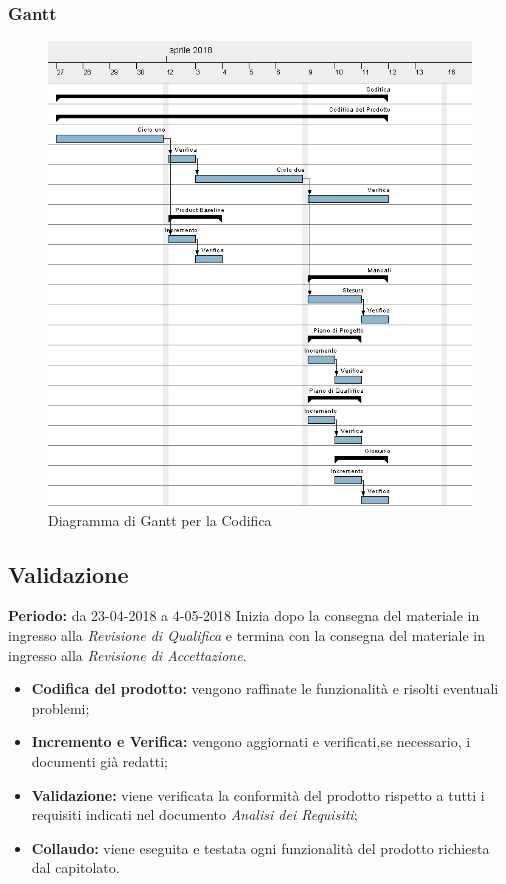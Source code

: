 \subsubsection{Gantt}
\begin{figure}[H]
	\centering 
	\includegraphics[width=1\textwidth]{images/Codifica.png}
	\caption{Diagramma di Gantt per la Codifica}
	\label{graficobello5} 
\end{figure}
\subsection{Validazione}
    \textbf{Periodo:} da 23-04-2018 a 4-05-2018\Spazio
    Inizia dopo la consegna del materiale in ingresso alla \emph{Revisione di Qualifica} e termina con la consegna del materiale in ingresso alla \emph{Revisione di Accettazione}.
    \begin{itemize}
    	\item \textbf{Codifica del prodotto:} vengono raffinate le funzionalità e risolti eventuali problemi;
    	\item \textbf{Incremento e Verifica:} vengono aggiornati e verificati,se necessario, i documenti già redatti; 
    	\item \textbf{Validazione:} viene verificata la conformità del prodotto rispetto a tutti i requisiti indicati nel documento \emph{Analisi dei Requisiti};
    	\item \textbf{Collaudo:} viene eseguita e testata ogni funzionalità del prodotto richiesta dal capitolato.
    \end{itemize}
